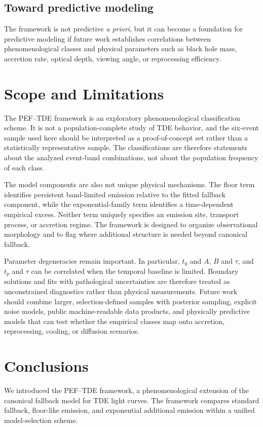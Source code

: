 \documentclass[11pt]{article}
\begin{document}
\subsection{Toward predictive modeling}
The framework is not predictive \textit{a priori}, but it can become a foundation for predictive modeling if future work establishes correlations between phenomenological classes and physical parameters such as black hole mass, accretion rate, optical depth, viewing angle, or reprocessing efficiency.

\section{Scope and Limitations}
The PEF--TDE framework is an exploratory phenomenological classification scheme. It is not a population-complete study of TDE behavior, and the six-event sample used here should be interpreted as a proof-of-concept set rather than a statistically representative sample. The classifications are therefore statements about the analyzed event-band combinations, not about the population frequency of each class.

The model components are also not unique physical mechanisms. The floor term identifies persistent band-limited emission relative to the fitted fallback component, while the exponential-family term identifies a time-dependent empirical excess. Neither term uniquely specifies an emission site, transport process, or accretion regime. The framework is designed to organize observational morphology and to flag where additional structure is needed beyond canonical fallback.

Parameter degeneracies remain important. In particular, $t_0$ and $A$, $B$ and $\tau$, and $t_p$ and $\tau$ can be correlated when the temporal baseline is limited. Boundary solutions and fits with pathological uncertainties are therefore treated as unconstrained diagnostics rather than physical measurements. Future work should combine larger, selection-defined samples with posterior sampling, explicit noise models, public machine-readable data products, and physically predictive models that can test whether the empirical classes map onto accretion, reprocessing, cooling, or diffusion scenarios.

\section{Conclusions}
We introduced the PEF--TDE framework, a phenomenological extension of the canonical fallback model for TDE light curves. The framework compares standard fallback, floor-like emission, and exponential additional emission within a unified model-selection scheme.
\end{document}
